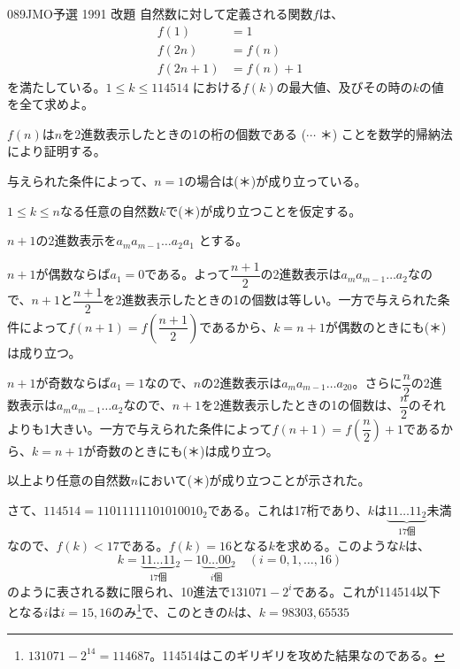 \begin{thm}{089}{}{JMO予選 1991 改題}
 自然数に対して定義される関数$f$は、
 \begin{align*}
  f(1)&=1 \\
  f(2n)&=f(n) \\
  f(2n+1)&=f(n)+1
 \end{align*}
 を満たしている。$1\le k \le 114514$ における$f(k)$の最大値、及びその時の$k$の値を全て求めよ。
\end{thm}

$f(n)$は$n$を2進数表示したときの1の桁の個数である ($\cdots$ ＊) ことを数学的帰納法により証明する。

与えられた条件によって、$n=1$の場合は(＊)が成り立っている。

$1\le k \le n$なる任意の自然数$k$で(＊)が成り立つことを仮定する。

$n+1$の2進数表示を$a_ma_{m-1}\dots a_2a_1$ とする。

$n+1$が偶数ならば$a_1=0$である。よって$\dfrac{n+1}{2}$の2進数表示は$a_ma_{m-1}\dots a_2$なので、$n+1$と$\dfrac{n+1}{2}$を2進数表示したときの1の個数は等しい。一方で与えられた条件によって$f(n+1)=f\left(\dfrac{n+1}{2}\right)$であるから、$k=n+1$が偶数のときにも(＊)は成り立つ。

$n+1$が奇数ならば$a_1=1$なので、$n$の2進数表示は$a_ma_{m-1}\dots a_20$。さらに$\dfrac{n}{2}$の2進数表示は$a_ma_{m-1}\dots a_2$なので、$n+1$を2進数表示したときの1の個数は、$\dfrac{n}{2}$のそれよりも1大きい。一方で与えられた条件によって$f(n+1)=f\left(\dfrac{n}{2}\right)+1$であるから、$k=n+1$が奇数のときにも(＊)は成り立つ。

以上より任意の自然数$n$において(＊)が成り立つことが示された。

さて、$114514=11011111101010010_2$である。これは17桁であり、$k$は$\underbrace{11\dots 11_2}_{\text{17個}}$未満なので、$f(k)<17$である。$f(k)=16$となる$k$を求める。このような$k$は、
\[ k=\underbrace{11\dots 11}_{\text{17個}}{}_2 - 1\underbrace{0\dots 00}_{i\text{個}}{}_2 \quad (i=0, 1,\dots , 16) \]
のように表される数に限られ、10進法で$131071-2^i$である。これが114514以下となる$i$は$i=15,16$のみ\footnote{$131071-2^{14}=114687$。114514はこのギリギリを攻めた結果なのである。}で、このときの$k$は、$k=98303, 65535$